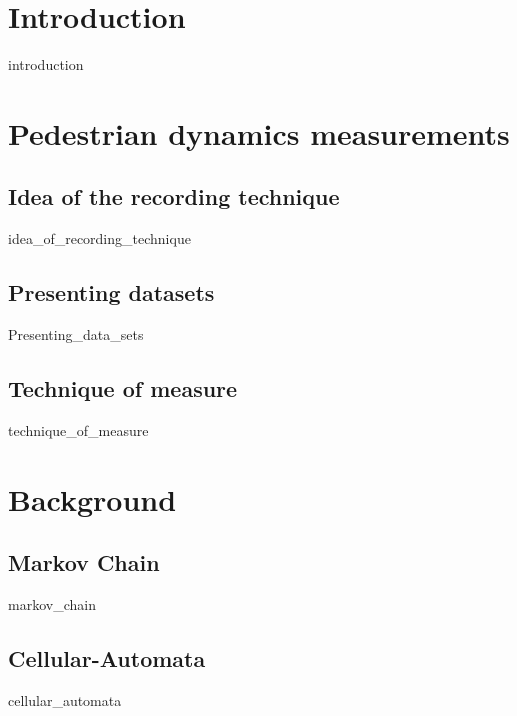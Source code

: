 \documentclass[10pt,a4paper]{report}
\begin{document}

\begin{abstract}
{abstract}
\end{abstract}



\tableofcontents



\chapter{Introduction}

{introduction}


\chapter{Pedestrian dynamics measurements}

\section{Idea of the recording technique}
{idea_of_recording_technique}

\section{Presenting datasets}
{Presenting_data_sets}

\section{Technique of measure}
{technique_of_measure}



\chapter{Background}

\section{Markov Chain}
{markov_chain}

\section{Cellular-Automata}
{cellular_automata}
\end{document}
